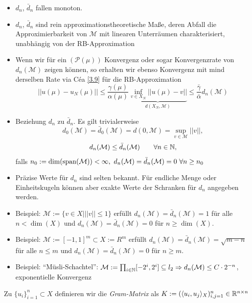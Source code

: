 \begin{bem} \beginwithlistbem
	\begin{itemize}
		\item $d_n$, $\bar{d}_n$ fallen monoton.
		\item $d_n$, $\bar{d}_n$ sind rein approximationstheoretische Maße, deren Abfall die Approximierbarkeit von $\mathcal{M}$ mit linearen Unterräumen charakterisiert, unabhängig von der RB-Approximation
		\item Wenn wir für ein $(\mathcal{P}(\mu))$ Konvergenz oder sogar Konvergenzrate von $d_n(\mathcal{M})$ zeigen können, so erhalten wir ebenso Konvergenz mit mind derselben Rate via Céa \ref{3.9} für die RB-Approximation
		\[
			|| u(\mu) - u_N(\mu) || \leq \frac{\gamma(\mu)}{\alpha(\mu)} \underbrace{\inf_{v \in X_N} || u(\mu) - v ||}_{d(X_N,\mathcal{M})} \leq \frac{\bar{\gamma}}{\bar{\alpha}} d_n(\mathcal{M})
		\]
		\item Beziehung $d_n$ zu $\bar{d}_n$. Es gilt trivialerweise
		\[
			d_0(\mathcal{M}) = \bar{d}_0(\mathcal{M}) = d(0,\mathcal{M}) = \sup_{v \in \mathcal{M}} ||v||,
		\]
		\[
			d_n(\mathcal{M}) \leq \bar{d}_n(\mathcal{M}) \qquad \forall n \in \mathbb{N},
		\]
		falls $n_0 := \dim(\operatorname{span}(\mathcal{M})) < \infty, \,\, d_n(\mathcal{M}) = \bar{d}_n(\mathcal{M}) = 0 \,\, \forall n \geq n_0$
		\item Präzise Werte für $d_n$ sind selten bekannt. Für endliche Menge oder Einheitskugeln können aber exakte Werte der Schranken für $d_n$ angegeben werden.
		\item Beispiel: $\mathcal{M} := \{v \in X|||v|| \leq 1\}$ erfüllt $d_n(\mathcal{M}) = \bar{d}_n(\mathcal{M}) = 1$ für alle $n < \dim(X)$ und $d_n(\mathcal{M}) = \bar{d}_n(\mathcal{M}) = 0$ für $n \geq \dim(X)$.
		\item Beispiel: $\mathcal{M} := [−1, 1]^m \subset X := R^m$ erfüllt $d_n(\mathcal{M}) = \bar{d}_n(\mathcal{M}) = \sqrt{m−n}$ für alle $n \leq m$ und $d_n(\mathcal{M}) = \bar{d}_n(\mathcal{M}) = 0$ für $n \geq m$.
		\item Beispiel: ``Müsli-Schachtel'': $\mathcal{M}:=\prod_{i \in \mathbb{N}} [-2^i,2^i] \subseteq l_2 \Rightarrow d_n(\mathcal{M}) \leq C \cdot 2^{-n}$, exponentielle Konvergenz
	\end{itemize}
\end{bem}

\begin{defn}
Zu $\{u_i\}_{i=1}^n \subset X$ definieren wir die \emph{Gram-Matrix} als $K:=(\langle u_i, u_j \rangle_X)_{i,j=1}^n \in \mathbb{R}^{n \times n}$
\end{defn}

